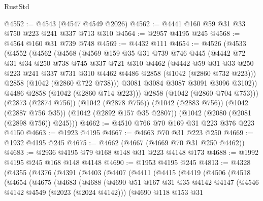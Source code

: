\begin{lexlean}{RustStd}
\begin{coremodule}
@4552 := @4543 (@4547 @4549 @2026)
@4562 := @4441 @160 @59 @31 @33 @750 @223 @241 @337 @713 @310
@4564 := @2957 @4195 @245
@4568 := @4564 @160 @31 @739 @748
@4569 := @4432 @111
@4654 := @4526
    (@4533
      (@4552
        (@4562
          (@4568
            (@4569
              @159
              @35
              @31
              @739
              @746
              @445
              (@4442
                @72
                @31
                @34
                @250
                @738
                @745
                @337
                @721
                @310
                @4462
                (@4442
                  @59
                  @31
                  @33
                  @250
                  @223
                  @241
                  @337
                  @731
                  @310
                  @4462
                  @4486
                  @2858
                  (@1042 (@2860 @732 @223)))
                @2858
                (@1042 (@2860 @722 @738)))
              @3081
              @3084
              @3087
              @3091
              @3096
              @3102))
          @4486
          @2858
          (@1042 (@2860 @714 @223)))
        @2858
        (@1042 (@2860 @704 @753)))
      (@2873 (@2874 @756))
      (@1042 (@2878 @756))
      (@1042 (@2883 @756))
      (@1042 (@2887 @756 @35))
      (@1042 (@2892 @157 @35 @2807))
      (@1042 (@2080 (@2081 (@2898 @756)) @245)))
@4662 := @4510 @766 @70 @169 @31 @223 @376 @223 @4150
@4663 := @1923 @4195
@4667 := @4663 @70 @31 @223 @250
@4669 := @1932 @4195 @245
@4675 := @4662 (@4667 (@4669 @70 @31 @250 @4462))
@4683 := @2936 @4195 @79 @168 @148 @31 @223 @4148 @173
@4688 := @1992 @4195 @245 @168 @148 @4148
@4690 := @1953 @4195 @245
@4813 := @4328
    (@4355
      (@4376
        (@4391
          (@4403
            (@4407
              (@4411
                (@4415
                  (@4419
                    (@4506
                      (@4518
                        (@4654
                          (@4675
                            (@4683
                              (@4688
                                (@4690
                                  @51
                                  @167
                                  @31
                                  @35
                                  @4142
                                  @4147
                                  (@4546 @4142 @4549 (@2023 (@2024 @4142)))
                                  (@4690
                                    @118
                                    @153
                                    @31

\end{coremodule}
\end{lexlean}
